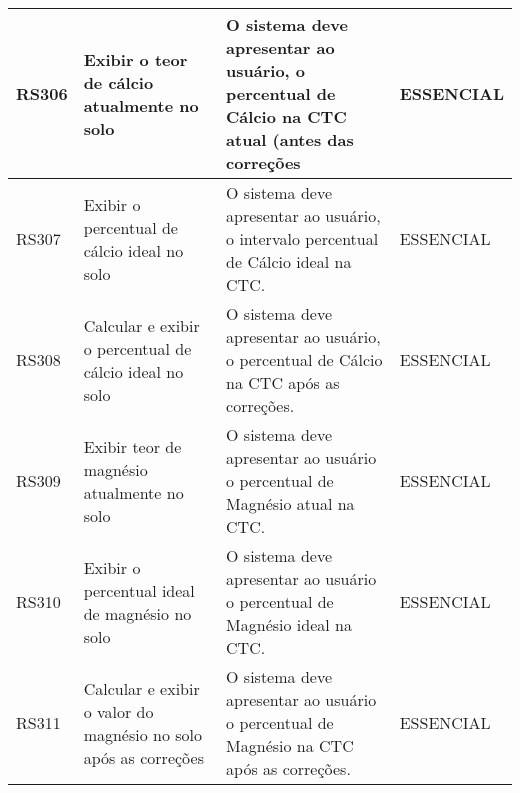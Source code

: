 \begin{table}
\begin{tabular}{|p{2cm}|p{4cm}|p{6cm}|p{2cm}|}
RS306 & Exibir o teor de cálcio atualmente no solo                                       & O sistema deve apresentar ao usuário, o percentual de Cálcio na CTC atual (antes das correções                                                                                                                                                                                                 & ESSENCIAL   \\ 
\hline
RS307 & Exibir o percentual de cálcio ideal no solo                                      & O sistema deve apresentar ao usuário, o intervalo percentual de Cálcio ideal na CTC.                                                                                                                                                                                                           & ESSENCIAL   \\ 
\hline
RS308 & Calcular e exibir o percentual de cálcio ideal no solo                           & O sistema deve apresentar ao usuário, o percentual de Cálcio na CTC após as correções.                                                                                                                                                                                                         & ESSENCIAL   \\ 
\hline
RS309 & Exibir teor de magnésio atualmente no solo                                       & O sistema deve apresentar ao usuário o percentual de Magnésio atual na CTC.                                                                                                                                                                                                                    & ESSENCIAL   \\ 
\hline
RS310 & Exibir o percentual ideal de magnésio no solo                                    & O sistema deve apresentar ao usuário o percentual de Magnésio ideal na CTC.                                                                                                                                                                                                                    & ESSENCIAL   \\ 
\hline
RS311 & Calcular e exibir o valor do magnésio no solo após as correções                  & O sistema deve apresentar ao usuário o percentual de Magnésio na CTC após as correções.                                                                                                                                                                                                        & ESSENCIAL   \\ 

\end{tabular}
\end{table}
